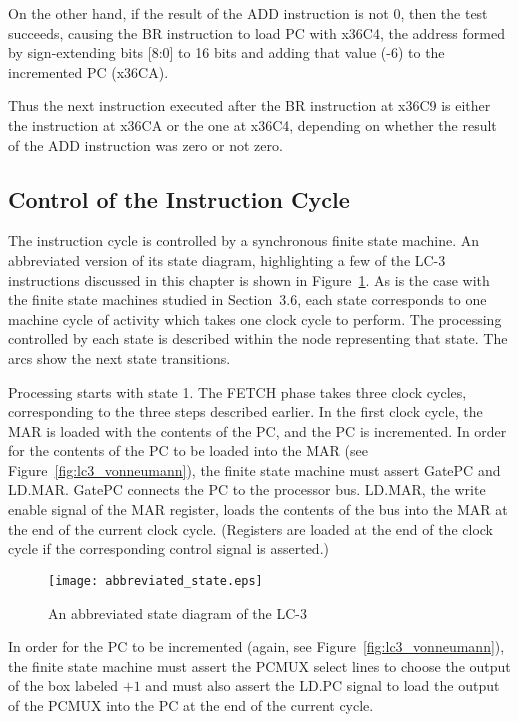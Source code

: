 \documentclass{patt}
\begin{document}
\begin{example}
On the other hand, if the result of the ADD instruction is not 0, then the
test succeeds, causing the BR instruction to load PC with x36C4, the address 
formed by sign-extending bits [8:0] to 16 bits and adding that value (-6) 
to the incremented PC (x36CA).

Thus the next instruction executed after the BR instruction at x36C9 is either
the instruction at x36CA or the one at x36C4, depending on whether the result
of the ADD instruction was zero or not zero.
\end{example}

\subsection{Control of the Instruction Cycle} 

The instruction cycle is controlled by a synchronous finite state machine.
An abbreviated version of its state diagram, highlighting a few
of the LC-3 instructions discussed in this chapter is shown in
Figure~\ref{fig:abbreviated_state}. 
As is the case with the finite state machines studied in Section~3.6,
each state corresponds to one machine cycle of activity which takes one
clock cycle to perform.  The processing
controlled by each state is described within the node representing that
state. The arcs show the next state transitions.

Processing starts with state 1.  The FETCH phase takes three clock cycles,
corresponding to the three steps described earlier.
In the first clock cycle, the MAR is loaded with the contents of the PC,
and the PC is incremented.  In order for the contents of the PC to be
loaded into the MAR (see Figure~\ref{fig:lc3_vonneumann}), the finite state 
machine must assert GatePC and LD.MAR.  GatePC connects the PC to the
processor bus.  LD.MAR, the write enable signal of the MAR register,
loads the contents of the bus into the MAR at the end of the current clock
cycle.  (Registers are loaded at the end of the clock cycle if the corresponding
control signal is asserted.)

\begin{figure}[b]
\centerline{\texttt{[image: abbreviated\_state.eps]}}
\caption{An abbreviated state diagram of the LC-3}
\label{fig:abbreviated_state}
\vspace{-12pt}
\end{figure}

In order for the PC to be incremented (again, see 
Figure~\ref{fig:lc3_vonneumann}), the finite state machine must assert the 
PCMUX select lines to choose the output of the
box labeled $+1$ and must also assert the LD.PC signal
to load the output of the PCMUX into the PC at the end of the current cycle.
\end{document}
